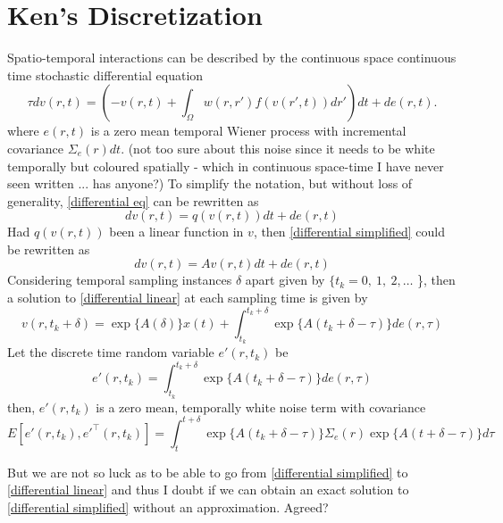 \documentclass[onecolumn,draftcls]{IEEEtran}
\begin{document}
\section{Ken's Discretization}
Spatio-temporal interactions can be described by the continuous space continuous time stochastic differential equation
\begin{equation}\label{differential eq}	
\tau dv\left( r,t \right) = \left( -v\left( r,t \right) + \int_\Omega  {w\left( r,r' \right)f\left( {v\left( r',t \right)} \right)dr'} \right) dt  + d e\left( r,t \right).
\end{equation}
where $e\left( r,t \right)$ is a zero mean temporal Wiener process with incremental covariance $\Sigma_e(r)dt$. (not too sure about this noise since it needs to be white temporally but coloured spatially - which in continuous space-time I have never seen written ... has anyone?)
To simplify the notation, but without loss of generality, \ref{differential eq} can be rewritten as
\begin{equation}\label{differential simplified}
	dv\left( r,t \right) = q\left(v(r,t) \right) dt  + d e\left( r,t \right)
\end{equation}
Had $q\left(v(r,t) \right)$ been a linear function in $v$, then \ref{differential simplified} could be rewritten as
\begin{equation}\label{differential linear}
	dv\left( r,t \right) = Av(r,t)dt  + d e\left( r,t \right)
\end{equation}
Considering temporal sampling instances $\delta$ apart given by $\{t_k = 0,~1,~2, \ldots$ \}, then a solution to \ref{differential linear} at each sampling time is given by
\begin{equation}\label{linear solution}
	v(r,t_k+\delta) = \exp\{A(\delta)\}x(t) + \int_{t_k}^{t_k+\delta}\exp\{A(t_k+\delta-\tau)\}de(r,\tau)
\end{equation}
Let the discrete time random variable $e'(r,t_k)$ be
\begin{equation}\label{discrete noise}
	e'(r,t_k) = \int_{t_k}^{t_k+\delta}\exp\{A(t_k+\delta-\tau)\}de(r,\tau)
\end{equation}
then, $e'(r,t_k)$ is a zero mean, temporally white noise term with covariance
\begin{equation}\label{covariance of noise}
	E\left[e'(r,t_k),e'^\top(r,t_k) \right] = \int_t^{t+\delta}\exp\{A(t_k+\delta-\tau)\} \Sigma_e(r) \exp\{A(t+\delta-\tau)\} d\tau
\end{equation}

But we are not so luck as to be able to go from \ref{differential simplified} to \ref{differential linear} and thus I doubt if we can obtain an exact solution to \ref{differential simplified} without an approximation. Agreed?
\end{document}
